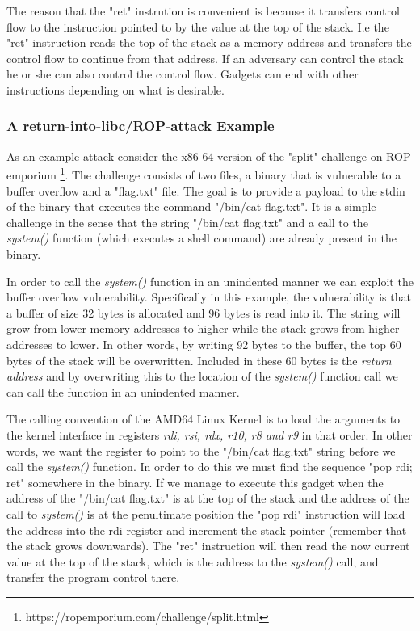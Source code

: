 The reason that the "ret" instrution is convenient is because it transfers control flow
to the instruction pointed to by the value at the top of the stack. I.e the "ret" instruction
reads the top of the stack as a memory address and transfers the control flow to continue
from that address. If an adversary can control the stack he or she can also control the
control flow. Gadgets can end with other instructions depending on what is desirable.

\subsubsection{A return-into-libc/ROP-attack Example}

As an example attack consider the x86-64 version of the "split" challenge on ROP emporium
\footnote{https://ropemporium.com/challenge/split.html}. The challenge consists of two
files, a binary that is vulnerable to a buffer overflow and a "flag.txt" file. The goal
is to provide a payload to the stdin of the binary that executes the command
"/bin/cat flag.txt". It is a simple challenge in the sense that the string "/bin/cat flag.txt"
and a call to the \textit{system()} function (which executes a shell command) are already
present in the binary.

In order to call the \textit{system()} function in an unindented manner we can exploit
the buffer overflow vulnerability. Specifically in this example, the vulnerability is that
a buffer of size 32 bytes is allocated and 96 bytes is read into it. The string will grow
from lower memory addresses to higher while the stack grows from higher addresses to
lower. In other words, by writing 92 bytes to the buffer, the top 60 bytes of the stack
will be overwritten. Included in these 60 bytes is the \textit{return address} and by
overwriting this to the location of the \textit{system()} function call we can call the
function in an unindented manner.

The calling convention of the AMD64 Linux Kernel is to load the arguments to the kernel
interface in registers \textit{rdi, rsi, rdx, r10, r8 and r9} in that order\cite{system-v-abi}.
In other words, we want the  register to point to the "/bin/cat flag.txt" string
before we call the \textit{system()} function. In order to do this we must find the sequence
"pop rdi; ret" somewhere in the binary. If we manage to execute this gadget when the
address of the "/bin/cat flag.txt" is at the top of the stack and the address of the call to 
\textit{system()} is at the penultimate position the "pop rdi" instruction will load the
address into the rdi register and increment the stack pointer (remember that the stack
grows downwards). The "ret" instruction will then read the now current value at the top of
the stack, which is the address to the \textit{system()} call, and transfer the program
control there.

